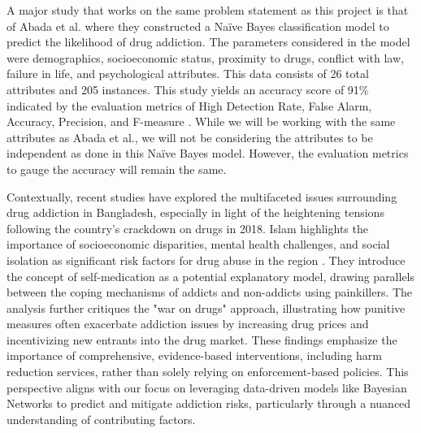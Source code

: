 \documentclass[conference]{IEEEtran}
\begin{document}
A major study that works on the same problem statement as this project is that of Abada et al. where they constructed a Naïve Bayes classification model to predict the likelihood of drug addiction. The parameters considered in the model were demographics, socioeconomic status, proximity to drugs, conflict with law, failure in life, and psychological attributes. This data consists of 26 total attributes and 205 instances. This study yields an accuracy score of 91\% indicated by the evaluation metrics of High Detection Rate, False Alarm, Accuracy, Precision, and F-measure \cite{abada_bayesian_model_drug_addiction}. While we will be working with the same attributes as Abada et al., we will not be considering the attributes to be independent as done in this Naïve Bayes model. However, the evaluation metrics to gauge the accuracy will remain the same.

Contextually, recent studies have explored the multifaceted issues surrounding drug addiction in Bangladesh, especially in light of the heightening tensions following the country's crackdown on drugs in 2018. Islam highlights the importance of socioeconomic disparities, mental health challenges, and social isolation as significant risk factors for drug abuse in the region \cite{drugWarJstor}. They introduce the concept of self-medication as a potential explanatory model, drawing parallels between the coping mechanisms of addicts and non-addicts using painkillers. The analysis further critiques the "war on drugs" approach, illustrating how punitive measures often exacerbate addiction issues by increasing drug prices and incentivizing new entrants into the drug market. These findings emphasize the importance of comprehensive, evidence-based interventions, including harm reduction services, rather than solely relying on enforcement-based policies. This perspective aligns with our focus on leveraging data-driven models like Bayesian Networks to predict and mitigate addiction risks, particularly through a nuanced understanding of contributing factors.
\end{document}
